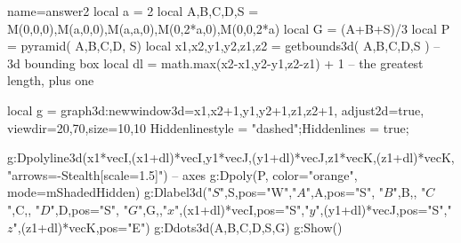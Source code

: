 \documentclass{standalone}
\begin{document}
\begin{luadraw}{name=answer2}
local a = 2
local A,B,C,D,S = M(0,0,0),M(a,0,0),M(a,a,0),M(0,2*a,0),M(0,0,2*a)
local G = (A+B+S)/3
local P = pyramid( {A,B,C,D}, S)
local x1,x2,y1,y2,z1,z2 = getbounds3d( {A,B,C,D,S} ) -- 3d bounding box
local dl = math.max(x2-x1,y2-y1,z2-z1) + 1 -- the greatest length, plus one

local g = graph3d:new{window3d={x1,x2+1,y1,y2+1,z1,z2+1}, adjust2d=true, viewdir={20,70},size={10,10}}
Hiddenlinestyle = "dashed";Hiddenlines = true;

g:Dpolyline3d({{x1*vecI,(x1+dl)*vecI},{y1*vecJ,(y1+dl)*vecJ},{z1*vecK,(z1+dl)*vecK}}, "arrows={-Stealth[scale=1.5]}") -- axes
g:Dpoly(P, {color="orange", mode=mShadedHidden})
 g:Dlabel3d("$S$",S,{pos="W"},"$A$",A,{pos="S"}, "$B$",B,{}, "$C$",C,{}, "$D$",D,{pos="S"}, "$G$",G,{},"$x$",(x1+dl)*vecI,{pos="S"},"$y$",(y1+dl)*vecJ,{pos="S"},"$z$",(z1+dl)*vecK,{pos="E"})
g:Ddots3d({A,B,C,D,S,G})
g:Show()
\end{luadraw}
\end{document}
